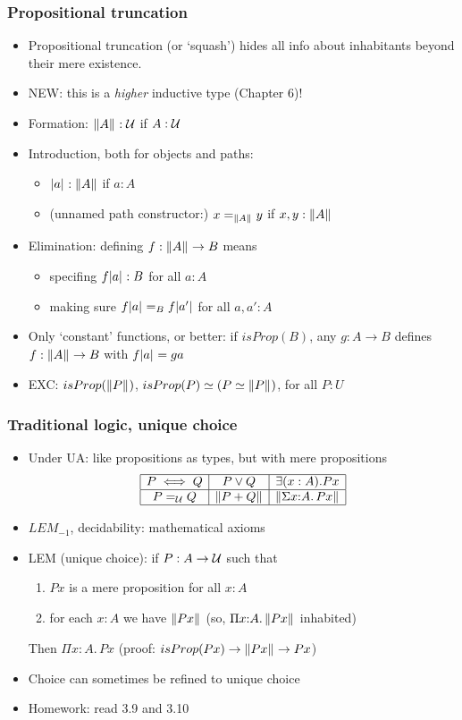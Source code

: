 \documentclass[handout]{beamer}
\newcommand{\depi}[3]{\Pi{#1{:}#2.\,#3}}
\newcommand{\sigm}[3]{\Sigma{#1{:}#2.\,#3}}
\newcommand{\UU}{{\cal U}}
\begin{document}
\frame
  {

    \frametitle{Propositional truncation}

    \begin{itemize}[<+->]
    \item Propositional truncation (or `squash') hides all info about inhabitants beyond their
          mere existence. 
    \item NEW: this is a \emph{higher} inductive type (Chapter 6)!
    \item Formation: $\brck A:\UU$ if $A:\UU$
    \item Introduction, both for objects and paths: 
      \begin{itemize}[<+->]   
      \item $\mathopen{}\left|a\right|_{}\mathclose{}  : \mathopen{}\left\Vert A\right\Vert_{}\mathclose{}$ if $a:A$
      \item (unnamed path constructor:) $x=_{\mathopen{}\left\Vert A\right\Vert_{}\mathclose{}} y$ if $x,y  : \mathopen{}\left\Vert A\right\Vert_{}\mathclose{}$
      \end{itemize}
    \item Elimination: defining $f:\mathopen{}\left\Vert A\right\Vert_{}\mathclose{} \to B$ means
      \begin{itemize}[<+->]   
      \item specifing $f \mathopen{}\left|a\right|_{}\mathclose{} : B$ for all $a:A$
      \item making sure $f \mathopen{}\left|a\right|_{}\mathclose{} =_B f \mathopen{}\left|a'\right|_{}\mathclose{}$ for all $a,a':A$
      \end{itemize}
    \item Only `constant' functions, or better: if $isProp(B)$, any $g:A\to B$
    defines $f:\mathopen{}\left\Vert A\right\Vert_{}\mathclose{} \to B$ with $f\mathopen{}\left|a\right|_{}\mathclose{} = ga$
    \item EXC: $isProp(\mathopen{}\left\Vert P\right\Vert_{}\mathclose{})$, $isProp(P) \simeq (P\simeq \mathopen{}\left\Vert P\right\Vert_{}\mathclose{})$, for all $P:U$
    \end{itemize}
  }

\frame
  {

    \frametitle{Traditional logic, unique choice}

    \begin{itemize}[<+->]
    \item Under UA: like propositions as types, but with mere propositions
\[
\begin{array}{|c|c|c|c|c|c|c|c|} \hline
     P\iff Q& P\vee Q & \exists (x:A). Px\\\hline
     P =_{\UU} Q&\brck{P+Q} &\brck{\sigm{x}{A}{Px}}\\\hline 
\end{array}\]
    \item $LEM_{-1}$, decidability: mathematical axioms
    \item LEM (unique choice): if $P:A\to\UU$ such that 
      \begin{enumerate}[<+->]   
      \item $Px$ is a mere proposition for all $x:A$
      \item for each $x:A$ we have $\mathopen{}\left\Vert Px\right\Vert_{}\mathclose{}$ (so, $\depi{x}{A}{\brck{Px}}$ inhabited)
      \end{enumerate}    
      Then $\depi{x}{A}{{Px}}$ (proof: $isProp(Px)\to{\mathopen{}\left\Vert Px\right\Vert_{}\mathclose{}}\to Px$)
    \item Choice can sometimes be refined to unique choice
    \item Homework: read 3.9 and 3.10
    \end{itemize}
  }
\end{document}
